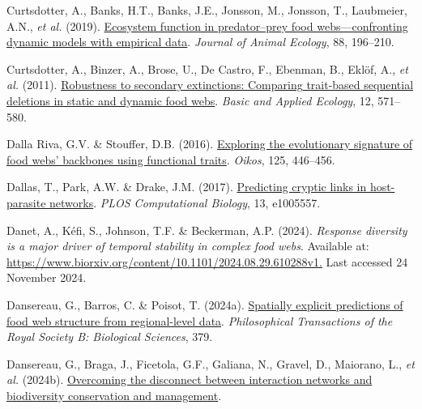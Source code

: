 \documentclass[
]{article}
\newlength{\cslhangindent}
\newenvironment{CSLReferences}[2] %
 {\begin{list}{}{%
  \setlength{\itemindent}{0pt}
  \setlength{\leftmargin}{0pt}
  \setlength{\parsep}{0pt}
  \ifodd #1
   \setlength{\leftmargin}{\cslhangindent}
   \setlength{\itemindent}{-1\cslhangindent}
  \fi
  \setlength{\itemsep}{#2\baselineskip}}}
 {\end{list}}
\begin{document}
\begin{CSLReferences}{1}{0}
Curtsdotter, A., Banks, H.T., Banks, J.E., Jonsson, M., Jonsson, T.,
Laubmeier, A.N., \emph{et al.} (2019).
\href{https://doi.org/10.1111/1365-2656.12892}{Ecosystem function in
predator--prey food webs---confronting dynamic models with empirical
data}. \emph{Journal of Animal Ecology}, 88, 196--210.

Curtsdotter, A., Binzer, A., Brose, U., De Castro, F., Ebenman, B.,
Eklöf, A., \emph{et al.} (2011).
\href{https://doi.org/10.1016/j.baae.2011.09.008}{Robustness to
secondary extinctions: {Comparing} trait-based sequential deletions in
static and dynamic food webs}. \emph{Basic and Applied Ecology}, 12,
571--580.

Dalla Riva, G.V. \& Stouffer, D.B. (2016).
\href{https://doi.org/10.1111/oik.02305}{Exploring the evolutionary
signature of food webs' backbones using functional traits}.
\emph{Oikos}, 125, 446--456.

Dallas, T., Park, A.W. \& Drake, J.M. (2017).
\href{https://doi.org/10.1371/journal.pcbi.1005557}{Predicting cryptic
links in host-parasite networks}. \emph{PLOS Computational Biology}, 13,
e1005557.

Danet, A., Kéfi, S., Johnson, T.F. \& Beckerman, A.P. (2024).
\emph{Response diversity is a major driver of temporal stability in
complex food webs}. Available at:
\href{https://www.biorxiv.org/content/10.1101/2024.08.29.610288v1}{https://www.biorxiv.org/content/10.1101/2024.08.29.610288v1.}
Last accessed 24 November 2024.

Dansereau, G., Barros, C. \& Poisot, T. (2024a).
\href{https://doi.org/10.1098/rstb.2023.0166}{Spatially explicit
predictions of food web structure from regional-level data}.
\emph{Philosophical Transactions of the Royal Society B: Biological
Sciences}, 379.

Dansereau, G., Braga, J., Ficetola, G.F., Galiana, N., Gravel, D.,
Maiorano, L., \emph{et al.} (2024b).
\href{https://ecoevorxiv.org/repository/view/8134/}{Overcoming the
disconnect between interaction networks and biodiversity conservation
and management}.


\end{CSLReferences}
\end{document}
